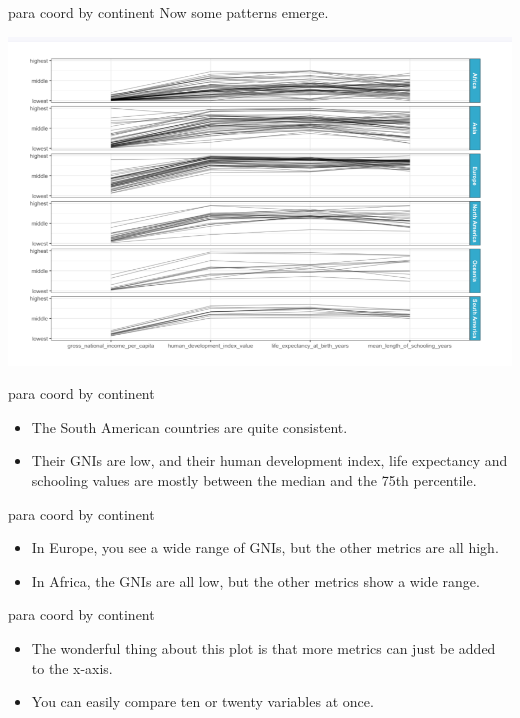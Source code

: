 \documentclass[
  ignorenonframetext,
]{beamer}
\begin{document}
\begin{frame}{para coord by continent}
\label{para-coord-by-continent}
Now some patterns emerge.

\includegraphics{../images/im99.png}
\end{frame}

\begin{frame}{para coord by continent}
\label{para-coord-by-continent-1}
\begin{itemize}
\item
  The South American countries are quite consistent.
\item
  Their GNIs are low, and their human development index, life expectancy
  and schooling values are mostly between the median and the 75th
  percentile.
\end{itemize}
\end{frame}

\begin{frame}{para coord by continent}
\label{para-coord-by-continent-2}
\begin{itemize}
\item
  In Europe, you see a wide range of GNIs, but the other metrics are all
  high.
\item
  In Africa, the GNIs are all low, but the other metrics show a wide
  range.
\end{itemize}
\end{frame}

\begin{frame}{para coord by continent}
\label{para-coord-by-continent-3}
\begin{itemize}
\item
  The wonderful thing about this plot is that more metrics can just be
  added to the x-axis.
\item
  You can easily compare ten or twenty variables at once.
\end{itemize}
\end{frame}
\end{document}
